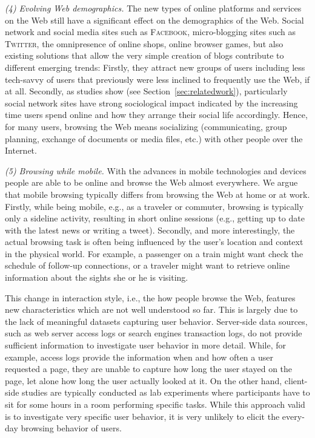 \documentclass[11pt,fleqn,twoside]{article}
\begin{document}
\textit{(4) Evolving Web demographics.}
The new types of online platforms and services on the Web still have a significant effect on the demographics of the Web. Social network and social media sites such as \textsc{Facebook}, micro-blogging sites such as \textsc{Twitter}, the omnipresence of online shops, online browser games, but also existing solutions that allow the very simple creation of blogs contribute to different emerging trends: Firstly, they attract new groups of users including less tech-savvy of users that previously were less inclined to frequently use the Web, if at all. Secondly, as studies show (see Section~\ref{sec:relatedwork}), particularly social network sites have strong sociological impact indicated by the increasing time users spend online and how they arrange their social life accordingly. Hence, for many users, browsing the Web means socializing (communicating, group planning, exchange of documents or media files, etc.) with other people over the Internet.

\textit{(5) Browsing while mobile.}
With the advances in mobile technologies and devices people are able to be online and browse the Web almost everywhere. We argue that mobile browsing typically differs from browsing the Web at home or at work. Firstly, while being mobile, e.g., as a traveler or commuter, browsing is typically only a sideline activity, resulting in short online sessions (e.g., getting up to date with the latest news or writing a tweet). Secondly, and more interestingly, the actual browsing task is often being influenced by the user's location and context in the physical world. For example, a passenger on a train might want check the schedule of follow-up connections, or a traveler might want to retrieve online information about the sights she or he is visiting.

This change in interaction style, i.e., the how people browse the Web, features new characteristics which are not well understood so far. This is largely due to the lack of meaningful datasets capturing user behavior.  Server-side data sources, such as web server access logs or search engines transaction logs, do not provide sufficient information to investigate user behavior in more detail. While, for example, access logs provide the information when and how often a user requested a page, they are unable to capture how long the user stayed on the page, let alone how long the user actually looked at it. On the other hand, client-side studies are typically conducted as lab experiments where participants have to sit for some hours in a room performing specific tasks. While this approach valid is to investigate very specific user behavior, it is very unlikely to elicit the every-day browsing behavior of users.
\end{document}
